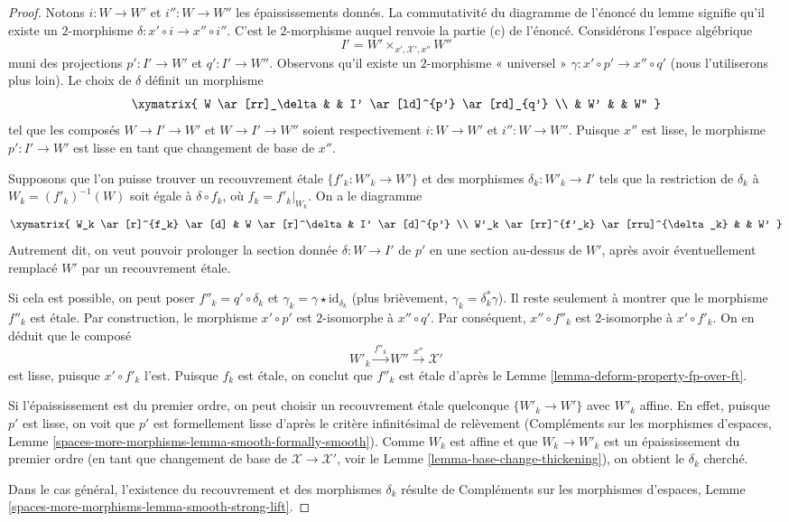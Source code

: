 \begin{proof}
Notons $i : W \to W'$ et $i'' : W \to W''$ les épaississements donnés.
La commutativité du diagramme de l'énoncé du lemme
signifie qu'il existe un $2$-morphisme $\delta : x' \circ i \to x'' \circ i''$.
C'est le $2$-morphisme auquel renvoie la partie (c) de l'énoncé.
Considérons l'espace algébrique
$$
I' = W' \times_{x', \mathcal{X}', x''} W''
$$
muni des projections $p' : I' \to W'$ et $q' : I' \to W''$.
Observons qu'il existe un $2$-morphisme « universel »
$\gamma : x' \circ p' \to x'' \circ q'$ (nous l'utiliserons plus loin).
Le choix de $\delta$ définit un morphisme
$$
\xymatrix{
W \ar[rr]_\delta & & I' \ar[ld]^{p'} \ar[rd]_{q'} \\
& W' & & W''
}
$$
tel que les composés $W \to I' \to W'$ et $W \to I' \to W''$
soient respectivement $i : W \to W'$ et $i'' : W \to W''$.
Puisque $x''$ est lisse, le morphisme $p' : I' \to W'$ est lisse
en tant que changement de base de $x''$.

\medskip\noindent
Supposons que l'on puisse trouver un recouvrement \'etale $\{f'_k : W'_k \to W'\}$
et des morphismes $\delta_k : W'_k \to I'$ tels que la restriction
de $\delta_k$ à $W_k = (f'_k)^{-1}(W)$ soit égale à $\delta \circ f_k$,
où $f_k = f'_k|_{W_k}$. On a le diagramme
$$
\xymatrix{
W_k \ar[r]^{f_k} \ar[d] & W \ar[r]^\delta & I' \ar[d]^{p'} \\
W'_k \ar[rr]^{f'_k} \ar[rru]^{\delta_k} & & W'
}
$$
Autrement dit, on veut pouvoir prolonger la section donnée
$\delta : W \to I'$ de $p'$ en une section au-dessus de $W'$, après avoir éventuellement
remplacé $W'$ par un recouvrement \'etale.

\medskip\noindent
Si cela est possible, on peut poser $f''_k = q' \circ \delta_k$
et $\gamma_k = \gamma \star \text{id}_{\delta_k}$ (plus brièvement,
$\gamma_k = \delta_k^*\gamma$). Il reste seulement à montrer
que le morphisme $f''_k$ est \'etale.
Par construction, le morphisme $x' \circ p'$ est $2$-isomorphe
à $x'' \circ q'$. Par conséquent, $x'' \circ f''_k$ est $2$-isomorphe
à $x' \circ f'_k$. On en déduit que le composé
$$
W'_k \xrightarrow{f''_k} W'' \xrightarrow{x''} \mathcal{X}'
$$
est lisse, puisque $x' \circ f'_k$ l'est.
Puisque $f_k$ est \'etale, on conclut que $f''_k$ est \'etale
d'après le Lemme \ref{lemma-deform-property-fp-over-ft}.

\medskip\noindent
Si l'épaississement est du premier ordre, on peut
choisir un recouvrement \'etale quelconque $\{W'_k \to W'\}$ avec $W'_k$ affine.
En effet, puisque $p'$ est lisse, on voit que $p'$ est formellement lisse d'après le
critère infinitésimal de relèvement (Compléments sur les morphismes d'espaces, Lemme
\ref{spaces-more-morphisms-lemma-smooth-formally-smooth}).
Comme $W_k$ est affine et que $W_k \to W'_k$ est un épaississement du premier ordre
(en tant que changement de base de $\mathcal{X} \to \mathcal{X}'$, voir
le Lemme \ref{lemma-base-change-thickening}), on obtient le $\delta_k$
cherché.

\medskip\noindent
Dans le cas général, l'existence du recouvrement et des morphismes
$\delta_k$ résulte de Compléments sur les morphismes d'espaces, Lemme
\ref{spaces-more-morphisms-lemma-smooth-strong-lift}.
\end{proof}

